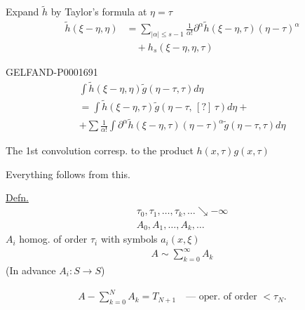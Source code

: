 Expand $\widetilde h$ by Taylor's formula at $\eta=\tau$
\begin{equation*}
\begin{aligned}
\widetilde h (\xi-\eta,\eta)&=
\sum_{|\alpha|\leq s-1}\frac{1}{\alpha!}
\partial^\alpha\widetilde h (\xi-\eta,\tau)(\eta-\tau)^\alpha\\
&\quad+h_s (\xi-\eta,\eta,\tau)
\end{aligned}
\end{equation*}



\begin{GelfandAdjacentEvidence}{GELFAND-P000169}{1}
\begin{gather*}
\int\widetilde h (\xi-\eta,\eta)\widetilde g (\eta-\tau,\tau)d\eta\\
=\int\widetilde h (\xi-\eta,\tau)\widetilde g (\eta-\tau,\, [?]\,\tau)d\eta+\\
+\sum\frac{1}{\alpha!}\int\partial^\alpha\widetilde h (\xi-\eta,\tau)
(\eta-\tau)^\alpha\widetilde g (\eta-\tau,\tau)d\eta
\end{gather*}

\end{GelfandAdjacentEvidence}

\hfill{}


The 1st convolution corresp. to the product $h (x,\tau)g (x,\tau)$

Everything follows from this.


\underline{Defn.}
\begin{gather*}
\tau_0,\tau_1,\ldots,\tau_k,\ldots\searrow-\infty\\
A_0, A_1,\ldots, A_k,\ldots
\end{gather*}
$A_i$ homog. of order $\tau_i$ with symbols $a_i (x,\xi)$
\begin{gather*}
A\sim\sum_{k=0}^{\infty}A_k
\end{gather*}
(In advance $A_i: S\longrightarrow S$)

\begin{gather*}
A-\sum_{k=0}^{N}A_k=T_{N+1}\quad\text{— oper. of order }<\tau_N.
\end{gather*}

